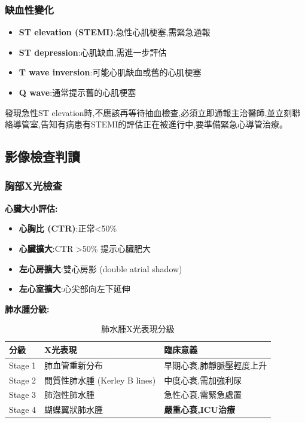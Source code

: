 \documentclass[12pt,a4paper]{article}
\newcommand{\warning}[1]{
    \par
    \noindent
    \begin{tcolorbox}[
        colback=warning_orange!5!white,
        colframe=warning_orange,
        title=\textbf{緊急通報},
        fonttitle=\bfseries,
        boxrule=1pt,
        arc=3pt,
        left=6pt,
        right=6pt,
        top=6pt,
        bottom=6pt
    ]
    #1
    \end{tcolorbox}
}
\begin{document}
\subsubsection{缺血性變化}
\begin{itemize}[nosep]
    \item \textbf{ST elevation (STEMI)}:急性心肌梗塞,需緊急通報
    \item \textbf{ST depression}:心肌缺血,需進一步評估
    \item \textbf{T wave inversion}:可能心肌缺血或舊的心肌梗塞
    \item \textbf{Q wave}:通常提示舊的心肌梗塞
\end{itemize}

\warning{
發現急性ST elevation時,不應該再等待抽血檢查,必須立即通報主治醫師,並立刻聯絡導管室,告知有病患有STEMI的評估正在被進行中,要準備緊急心導管治療。
}

\subsection{影像檢查判讀}

\subsubsection{胸部X光檢查}
\textbf{心臟大小評估:}
\begin{itemize}[nosep]
    \item \textbf{心胸比 (CTR)}:正常<50\%
    \item \textbf{心臟擴大}:CTR >50\% 提示心臟肥大
    \item \textbf{左心房擴大}:雙心房影 (double atrial shadow)
    \item \textbf{左心室擴大}:心尖部向左下延伸
\end{itemize}

\textbf{肺水腫分級:}
\begin{table}[h]
    \centering
    \caption{肺水腫X光表現分級}
    \begin{tabular}{p{2cm} p{5cm} p{7cm}}
        \toprule
        \textbf{分級} & \textbf{X光表現} & \textbf{臨床意義} \\
        \midrule
        Stage 1 & 肺血管重新分布 & 早期心衰,肺靜脈壓輕度上升 \\
        Stage 2 & 間質性肺水腫 (Kerley B lines) & 中度心衰,需加強利尿 \\
        Stage 3 & 肺泡性肺水腫 & 急性心衰,需緊急處置 \\
        Stage 4 & 蝴蝶翼狀肺水腫 & \textcolor{emergency_red}{\textbf{嚴重心衰,ICU治療}} \\
        \bottomrule
    \end{tabular}
\end{table}
\end{document}
